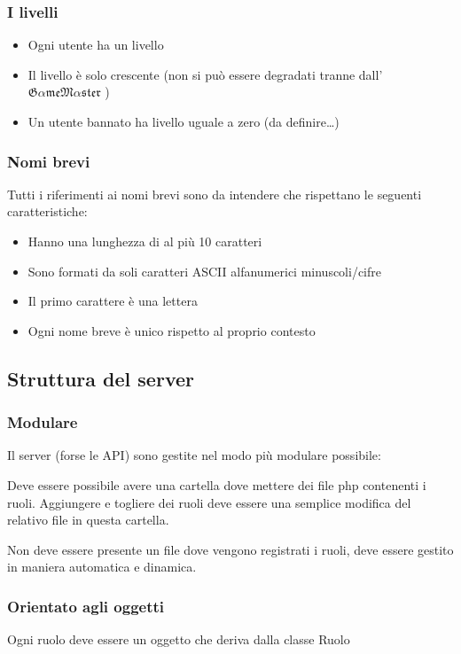 \documentclass[10pt,a4paper]{article}
\newcommand{\GameMaster}{
$\mathfrak{G\alpha me}
\allowbreak \mathfrak{M\alpha ster}$
}
\begin{document}
\subsubsection{I livelli}
\begin{itemize}
\item Ogni utente ha un livello
\item Il livello è solo crescente (non si può essere degradati tranne dall'\GameMaster)
\item Un utente bannato ha livello uguale a zero (da definire\dots)
\end{itemize}

\subsubsection{Nomi brevi}
Tutti i riferimenti ai nomi brevi sono da intendere che rispettano le seguenti caratteristiche:
\begin{itemize}
\item Hanno una lunghezza di al più 10 caratteri
\item Sono formati da soli caratteri ASCII alfanumerici minuscoli/cifre
\item Il primo carattere è una lettera
\item Ogni nome breve è unico rispetto al proprio contesto
\end{itemize}

\subsection{Struttura del server}
\subsubsection*{Modulare}
Il server (forse le API) sono gestite nel modo più modulare possibile:

Deve essere possibile avere una cartella dove mettere dei file php contenenti i ruoli. Aggiungere e togliere dei ruoli deve essere una semplice modifica del relativo file in questa cartella. 

Non deve essere presente un file dove vengono registrati i ruoli, deve essere gestito in maniera automatica e dinamica.

\subsubsection*{Orientato agli oggetti}
Ogni ruolo deve essere un oggetto che deriva dalla classe \textsf{Ruolo}
\end{document}
